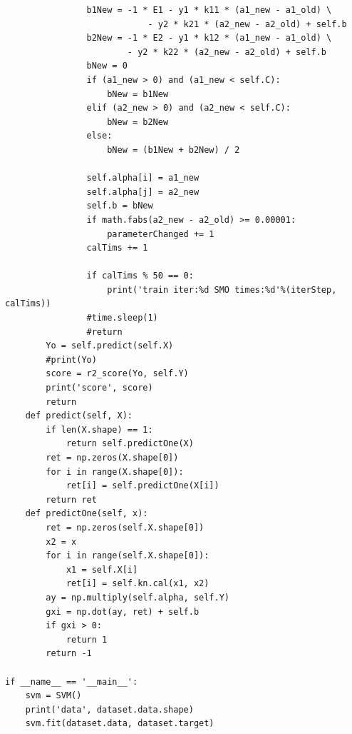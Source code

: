 \documentclass[12pt, a4paper, oneside]{ctexart}
\begin{document}
\begin{appendices}
\begin{lstlisting}
                b1New = -1 * E1 - y1 * k11 * (a1_new - a1_old) \
                            - y2 * k21 * (a2_new - a2_old) + self.b
                b2New = -1 * E2 - y1 * k12 * (a1_new - a1_old) \
                        - y2 * k22 * (a2_new - a2_old) + self.b
                bNew = 0
                if (a1_new > 0) and (a1_new < self.C):
                    bNew = b1New
                elif (a2_new > 0) and (a2_new < self.C):
                    bNew = b2New
                else:
                    bNew = (b1New + b2New) / 2

                self.alpha[i] = a1_new
                self.alpha[j] = a2_new
                self.b = bNew
                if math.fabs(a2_new - a2_old) >= 0.00001:
                    parameterChanged += 1
                calTims += 1
                
                if calTims % 50 == 0:
                    print('train iter:%d SMO times:%d'%(iterStep, calTims))
                #time.sleep(1)
                #return
        Yo = self.predict(self.X)
        #print(Yo)
        score = r2_score(Yo, self.Y)
        print('score', score)
        return
    def predict(self, X):
        if len(X.shape) == 1:
            return self.predictOne(X)
        ret = np.zeros(X.shape[0])
        for i in range(X.shape[0]):
            ret[i] = self.predictOne(X[i])
        return ret
    def predictOne(self, x):
        ret = np.zeros(self.X.shape[0])
        x2 = x
        for i in range(self.X.shape[0]):
            x1 = self.X[i]
            ret[i] = self.kn.cal(x1, x2)
        ay = np.multiply(self.alpha, self.Y)
        gxi = np.dot(ay, ret) + self.b
        if gxi > 0:
            return 1
        return -1

if __name__ == '__main__':
    svm = SVM()
    print('data', dataset.data.shape)
    svm.fit(dataset.data, dataset.target)

\end{lstlisting}

\end{appendices}
\end{document}
